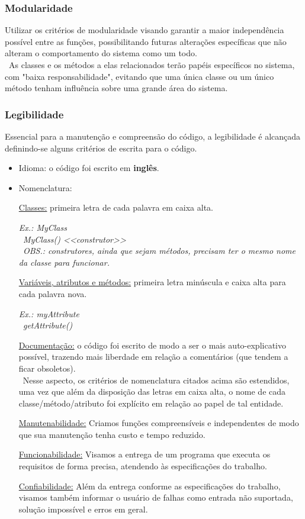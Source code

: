 \documentclass[a4paper]{article}
\begin{document}
\subsubsection{Modularidade}
Utilizar os critérios de modularidade visando garantir a maior independência possível entre as funções, possibilitando futuras alterações específicas que não alteram o comportamento do sistema como um todo. \\\
As classes e os métodos a elas relacionados terão papéis específicos no sistema, com "baixa responsabilidade", evitando que uma única classe ou um único método tenham influência sobre uma grande área do sistema.

\subsubsection{Legibilidade}
Essencial para a manutenção e compreensão do código, a legibilidade é alcançada definindo-se alguns critérios de escrita para o código.

\begin{itemize}
\item Idioma:  o código foi escrito em \textbf{inglês}.
\item  Nomenclatura:
\par \underline{Classes:} primeira letra de cada palavra em caixa alta.
\par \textit{Ex.: MyClass \\\ MyClass() <<construtor>> \\\ OBS.: construtores, ainda que sejam métodos, precisam ter o mesmo nome da classe para funcionar.}
\par \underline{Variáveis, atributos e métodos:}  primeira letra minúscula e caixa alta para cada palavra nova.
\par \textit{Ex.: myAttribute \\\ getAttribute()}

\par \underline{Documentação:}  o código foi escrito de modo a ser o mais auto-explicativo possível, trazendo mais liberdade em relação a comentários (que tendem a ficar obsoletos).\\\ Nesse aspecto, os critérios de nomenclatura citados acima são estendidos, uma vez que além da disposição das letras em caixa alta, o nome de cada classe/método/atributo foi explícito em relação ao papel de tal entidade.

\par \underline{Manutenabilidade:} Criamos funções compreensíveis e independentes de modo que sua manutenção tenha custo e tempo reduzido.

\par \underline{Funcionabilidade:} Visamos a entrega de um programa que executa os requisitos de forma precisa, atendendo às especificações do trabalho.

\par \underline{Confiabilidade:}
Além da entrega conforme as especificações do trabalho, visamos também informar o usuário de falhas como entrada não suportada, solução impossível e erros em geral.
\end{itemize}
\end{document}
